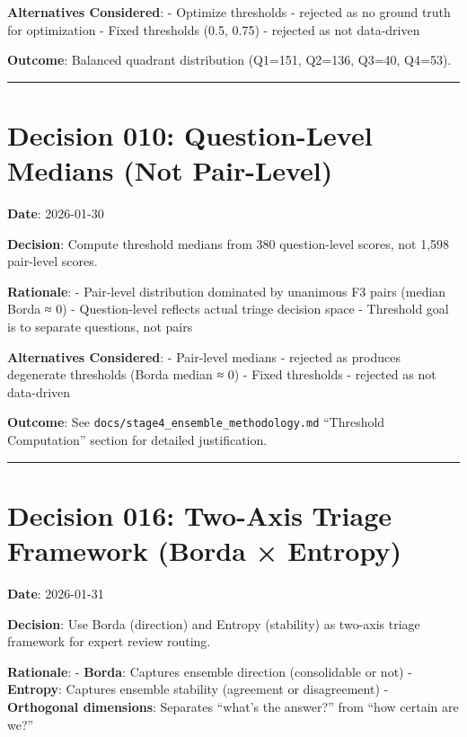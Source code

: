 \documentclass[
  letterpaper,
]{report}
\begin{document}
\textbf{Alternatives Considered}: - Optimize thresholds - rejected as no
ground truth for optimization - Fixed thresholds (0.5, 0.75) - rejected
as not data-driven

\textbf{Outcome}: Balanced quadrant distribution (Q1=151, Q2=136, Q3=40,
Q4=53).

\begin{center}\rule{0.5\linewidth}{0.5pt}\end{center}

\section{Decision 010: Question-Level Medians (Not
Pair-Level)}\label{decision-010-question-level-medians-not-pair-level}

\textbf{Date}: 2026-01-30

\textbf{Decision}: Compute threshold medians from 380 question-level
scores, not 1,598 pair-level scores.

\textbf{Rationale}: - Pair-level distribution dominated by unanimous F3
pairs (median Borda ≈ 0) - Question-level reflects actual triage
decision space - Threshold goal is to separate questions, not pairs

\textbf{Alternatives Considered}: - Pair-level medians - rejected as
produces degenerate thresholds (Borda median ≈ 0) - Fixed thresholds -
rejected as not data-driven

\textbf{Outcome}: See \texttt{docs/stage4\_ensemble\_methodology.md}
``Threshold Computation'' section for detailed justification.

\begin{center}\rule{0.5\linewidth}{0.5pt}\end{center}

\section{Decision 016: Two-Axis Triage Framework (Borda ×
Entropy)}\label{decision-016-two-axis-triage-framework-borda-entropy}

\textbf{Date}: 2026-01-31

\textbf{Decision}: Use Borda (direction) and Entropy (stability) as
two-axis triage framework for expert review routing.

\textbf{Rationale}: - \textbf{Borda}: Captures ensemble direction
(consolidable or not) - \textbf{Entropy}: Captures ensemble stability
(agreement or disagreement) - \textbf{Orthogonal dimensions}: Separates
``what's the answer?'' from ``how certain are we?''
\end{document}
